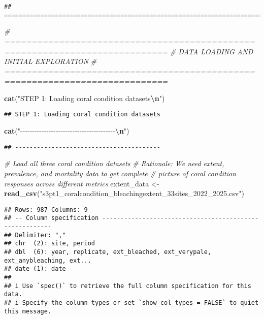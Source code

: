 \documentclass[
]{article}
\newenvironment{Shaded}{\begin{snugshade}}{\end{snugshade}}
\newcommand{\CommentTok}[1]{\textcolor[rgb]{0.56,0.35,0.01}{\textit{#1}}}
\newcommand{\FunctionTok}[1]{\textcolor[rgb]{0.13,0.29,0.53}{\textbf{#1}}}
\newcommand{\NormalTok}[1]{#1}
\newcommand{\OtherTok}[1]{\textcolor[rgb]{0.56,0.35,0.01}{#1}}
\newcommand{\SpecialCharTok}[1]{\textcolor[rgb]{0.81,0.36,0.00}{\textbf{#1}}}
\newcommand{\StringTok}[1]{\textcolor[rgb]{0.31,0.60,0.02}{#1}}
\begin{document}
\begin{verbatim}
## ============================================================================
\end{verbatim}

\begin{Shaded}
\begin{Highlighting}[]
\CommentTok{\# ============================================================================}
\CommentTok{\# DATA LOADING AND INITIAL EXPLORATION}
\CommentTok{\# ============================================================================}

\FunctionTok{cat}\NormalTok{(}\StringTok{"STEP 1: Loading coral condition datasets}\SpecialCharTok{\textbackslash{}n}\StringTok{"}\NormalTok{)}
\end{Highlighting}
\end{Shaded}

\begin{verbatim}
## STEP 1: Loading coral condition datasets
\end{verbatim}

\begin{Shaded}
\begin{Highlighting}[]
\FunctionTok{cat}\NormalTok{(}\StringTok{"{-}{-}{-}{-}{-}{-}{-}{-}{-}{-}{-}{-}{-}{-}{-}{-}{-}{-}{-}{-}{-}{-}{-}{-}{-}{-}{-}{-}{-}{-}{-}{-}{-}{-}{-}{-}{-}{-}{-}{-}}\SpecialCharTok{\textbackslash{}n}\StringTok{"}\NormalTok{)}
\end{Highlighting}
\end{Shaded}

\begin{verbatim}
## ----------------------------------------
\end{verbatim}

\begin{Shaded}
\begin{Highlighting}[]
\CommentTok{\# Load all three coral condition datasets}
\CommentTok{\# Rationale: We need extent, prevalence, and mortality data to get complete}
\CommentTok{\# picture of coral condition responses across different metrics}
\NormalTok{extent\_data }\OtherTok{\textless{}{-}} \FunctionTok{read\_csv}\NormalTok{(}\StringTok{"s3pt1\_coralcondition\_bleachingextent\_33sites\_2022\_2025.csv"}\NormalTok{)}
\end{Highlighting}
\end{Shaded}

\begin{verbatim}
## Rows: 987 Columns: 9
## -- Column specification --------------------------------------------------------
## Delimiter: ","
## chr  (2): site, period
## dbl  (6): year, replicate, ext_bleached, ext_verypale, ext_anybleaching, ext...
## date (1): date
## 
## i Use `spec()` to retrieve the full column specification for this data.
## i Specify the column types or set `show_col_types = FALSE` to quiet this message.
\end{verbatim}
\end{document}
